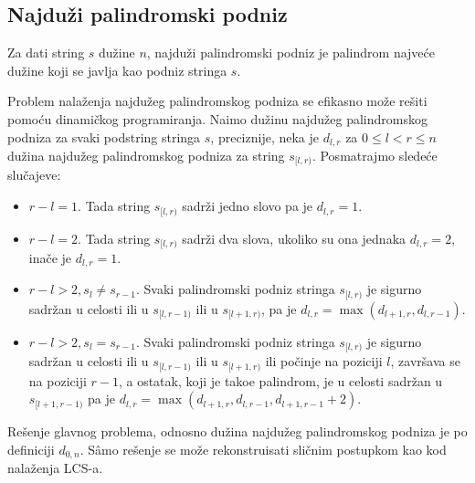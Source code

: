 \subsection{Najdu\v zi palindromski podniz}

\begin{dfn}
Za dati string $s$ du\v zine $n$, najdu\v zi palindromski podniz je palindrom najve\' ce du\v zine koji se javlja kao podniz stringa $s$.
\end{dfn}

Problem nala\v zenja najdu\v zeg palindromskog podniza se efikasno mo\v ze re\v siti pomo\' cu dinami\v ckog programiranja. Na\dj imo du\v zinu najdu\v zeg palindromskog podniza za svaki podstring stringa $s$, preciznije, neka je $d_{l,r}$ za $0 \leq l < r \leq n$ du\v zina najdu\v zeg palindromskog podniza za string $s_{[l,r)}$. Posmatrajmo slede\' ce slu\v cajeve:

\begin{itemize}
    \item $r-l = 1$. Tada string $s_{[l,r)}$ sadr\v zi jedno slovo pa je $d_{l,r} = 1$.
    \item $r-l = 2$. Tada string $s_{[l,r)}$ sadr\v zi dva slova, ukoliko su ona jednaka $d_{l,r} = 2$, ina\v ce je $d_{l,r} = 1$.
    \item $r-l > 2, s_l \not = s_{r-1}$. Svaki palindromski podniz stringa $s_{[l, r)}$ je sigurno sadr\v zan u celosti ili u $s_{[l, r-1)}$ ili u $s_{[l+1, r)}$, pa je $d_{l,r} = \max(d_{l+1,r}, d_{l,r-1})$.
    \item $r-l > 2, s_l = s_{r-1}$. Svaki palindromski podniz stringa $s_{[l, r)}$ je sigurno sadr\v zan u celosti ili u $s_{[l, r-1)}$ ili u $s_{[l+1, r)}$ ili po\v cinje na poziciji $l$, zavr\v sava se na poziciji $r-1$, a ostatak, koji je tako\dj e palindrom, je u celosti sadr\v zan u $s_{[l+1,r-1)}$ pa je $d_{l,r} = \max(d_{l+1,r}, d_{l,r-1}, d_{l+1,r-1}+2)$.
\end{itemize}

Re\v senje glavnog problema, odnosno du\v zina najdu\v zeg palindromskog podniza je po definiciji $d_{0,n}$. S\^amo re\v senje se mo\v ze rekonstruisati sli\v cnim postupkom kao kod nala\v zenja LCS-a.

\noindent
\begin{minipage}[l]{\textwidth}

\end{minipage}

